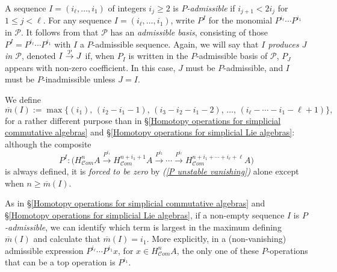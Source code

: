 \documentclass[11pt]{amsart} \renewcommand{\baselinestretch}{1.4}
\theoremstyle{plain}
\newtheorem{lem}[thm]{Lemma}
\theoremstyle{definition}
\renewcommand{\to}{\longrightarrow}
\newcommand{\scrC}{\mathscr{C}}
\newcommand{\calP}{\mathcal{P}}
\newcommand{\Palg}{{\calP}}
\newcommand{\minDimP}{\overline{m}}
\newcommand{\minDimDelta}{m}
\newcommand{\produces}[3]{#3:#1\sim #2}
\renewcommand{\produces}[3]{#1\rightarrow_{#3} #2}%
\renewcommand{\produces}[3]{#1\overset{\smash{#3}}{\rightarrow} #2}%
\newcommand{\algs}{{\scrC\!\textit{om}}}
\begin{document}
\begin{Constructing cohomology operations}
A sequence $I=(i_\ell,\ldots,i_1)$ of integers $i_j\geq2$ is \emph{$P$-admissible} if $i_{j+1}<2i_j$ for $1\leq j <\ell$. For any sequence $I=(i_\ell,\ldots,i_1)$, write $P^I$ for the monomial $P^{i_\ell}\cdots P^{i_1}$ in $\Palg$. It follows from \cite[Theorem I]{MR1089001} that $\Palg$ has an \emph{admissible basis}, consisting of those $P^I=P^{i_\ell}\cdots P^{i_{1}}$ with $I$ a $P$-admissible sequence.  Again, we will say that \emph{$I$ produces $J$ in $\Palg$}, denoted $\produces{I}{J}{\Palg}$ if, when $P_I$ is written in the $P$-admissible basis of $\Palg$, $P_J$ appears with non-zero coefficient. In this case, $J$ must be $P$-admissible, and $I$ must be $P$-inadmissible unless $J=I$.

We define
\[\minDimP(I):=\max\{(i_1),\,(i_2-i_1-1),\,(i_3-i_2-i_1-2),\,\ldots,\,(i_{\ell}-\cdots-i_1-\ell+1)\},\]
for a rather different purpose than in \S\ref{Homotopy operations for simplicial commutative algebras} and \S\ref{Homotopy operations for simplicial Lie algebras}: although the composite 
\[P^I:\bigl(H_{\algs}^{n}A\overset{P^{i_1}}{\to}H_{\algs}^{n+i_1+1}A\overset{P^{i_2}}{\to}\cdots \overset{P^{i_\ell}}{\to}H_{\algs}^{n+i_1+\cdots +i_\ell+\ell}A\bigr)\]
is always defined, it is \emph{forced to be zero} by \emph{(\ref{P unstable vanishing})} alone except  when $n\geq\minDimP(I)$.

As in \S\ref{Homotopy operations for simplicial commutative algebras} and \S\ref{Homotopy operations for simplicial Lie algebras}, if a non-empty sequence $I$  is \emph{$P$-admissible}, we can identify which term is largest in the maximum defining $\minDimP(I)$ and calculate that $\minDimP(I)=i_1$. More explicitly, in a (non-vanishing) admissible expression $P^{i_\ell}\cdots P^{i_1}x$, for $x\in H^n_{\algs}A$, the only one of these $P$-operations that can be a top operation is $P^{i_{1}}$.




\end{Constructing cohomology operations}
\end{document}
